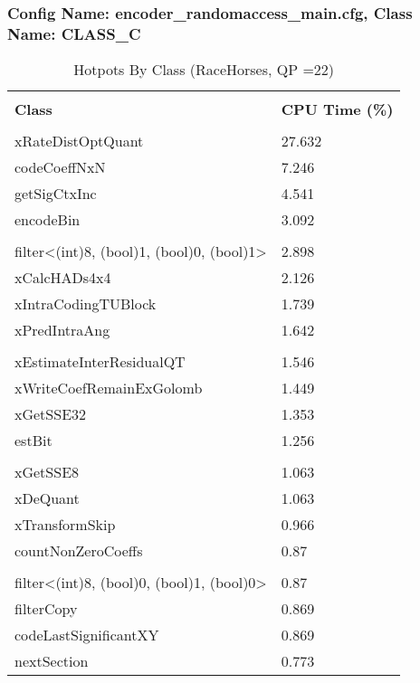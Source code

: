 \documentclass{article}%
\begin{document}
\subsubsection{Config Name: encoder\_randomaccess\_main.cfg, Class Name: CLASS\_C}%
\label{ssubsec:ConfigNameencoderrandomaccessmain.cfg,ClassNameCLASSC}%
\begin{longtabu}{| X[l] | X[l] |}%
\caption{%
Hotpots By Class (RaceHorses, QP =22)%
}%
\hline%
&\\%
\textbf{Class}&\textbf{CPU Time (\%)}\\%
&\\%
\hline%
\endhead%
xRateDistOptQuant&27.632\\%
\hline%
codeCoeffNxN&7.246\\%
\hline%
getSigCtxInc&4.541\\%
\hline%
encodeBin&3.092\\%
\hline%
&\\%
\hline%
filter<(int)8, (bool)1, (bool)0, (bool)1>&2.898\\%
\hline%
xCalcHADs4x4&2.126\\%
\hline%
xIntraCodingTUBlock&1.739\\%
\hline%
xPredIntraAng&1.642\\%
\hline%
&\\%
\hline%
xEstimateInterResidualQT&1.546\\%
\hline%
xWriteCoefRemainExGolomb&1.449\\%
\hline%
xGetSSE32&1.353\\%
\hline%
estBit&1.256\\%
\hline%
&\\%
\hline%
xGetSSE8&1.063\\%
\hline%
xDeQuant&1.063\\%
\hline%
xTransformSkip&0.966\\%
\hline%
countNonZeroCoeffs&0.87\\%
\hline%
&\\%
\hline%
filter<(int)8, (bool)0, (bool)1, (bool)0>&0.87\\%
\hline%
filterCopy&0.869\\%
\hline%
codeLastSignificantXY&0.869\\%
\hline%
nextSection&0.773\\%
\hline%
\end{longtabu}%
\newpage%
\end{document}

